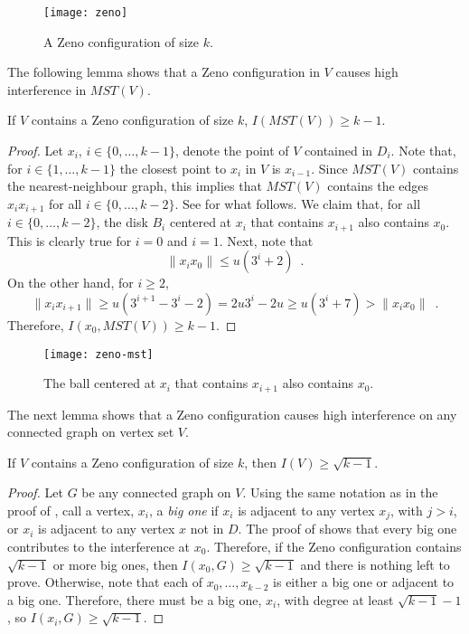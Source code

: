 \documentclass{patmorin}
\newcommand{\mst}{\mathit{MST}}
\begin{document}
\begin{figure}
  \begin{center}
    \texttt{[image: zeno]}
  \end{center}
  \caption{A Zeno configuration of size $k$.}
\end{figure}


The following lemma shows that a Zeno configuration in $V$ causes high
interference in $\mst(V)$.

\begin{lem}
If $V$ contains a Zeno configuration of size $k$, $I(\mst(V))\ge k-1$.
\end{lem}

\begin{proof}
Let $x_i$, $i\in\{0,\ldots,k-1\}$, denote the point of $V$ contained in
$D_i$.  Note that, for $i\in\{1,\ldots,k-1\}$ the closest point to $x_i$
in $V$ is $x_{i-1}$.  Since $\mst(V)$ contains the nearest-neighbour
graph, this implies that $\mst(V)$ contains the edges $x_ix_{i+1}$ for
all $i\in\{0,\ldots,k-2\}$.  See  for what follows.
We claim that, for all $i\in\{0,\ldots,k-2\}$, the disk $B_i$ centered
at $x_i$ that contains $x_{i+1}$ also contains $x_0$.  This is clearly
true for $i=0$ and $i=1$.  Next, note that
\[
  \|x_ix_0\| \le u(3^i+2) \enspace .
\]
On the other hand, for $i\ge 2$,
\[
  \|x_ix_{i+1}\| \ge u(3^{i+1}-3^i-2) = 2u3^i-2u \ge u(3^i + 7) > 
\|x_ix_0\| \enspace .
\]
Therefore, $I(x_0,\mst(V)) \ge k-1$.
\end{proof}

\begin{figure}
  \begin{center}
    \texttt{[image: zeno-mst]}
  \end{center}
  \caption{The ball centered at $x_i$ that contains $x_{i+1}$ also contains $x_0$.}
\end{figure}

The next lemma shows that a Zeno configuration causes high interference on
any connected graph on vertex set $V$.

\begin{lem}
If $V$ contains a Zeno configuration of size $k$, then $I(V)\ge\sqrt{k-1}$.
\end{lem}

\begin{proof}
Let $G$ be any connected graph on $V$.  Using the same notation as
in the proof of , call a vertex, $x_i$, a \emph{big
one} if $x_i$ is adjacent to any vertex $x_j$, with $j>i$, or $x_i$ is
adjacent to any vertex $x$ not in $D$.  The proof of 
shows that every big one contributes to the interference at $x_0$.
Therefore, if the Zeno configuration contains $\sqrt{k-1}$ or more big
ones, then $I(x_0,G)\ge\sqrt{k-1}$ and there is nothing left to prove.
Otherwise, note that each of $x_0,\ldots,x_{k-2}$ is either a big one
or adjacent to a big one. Therefore, there must be a big one, $x_i$,
with degree at least $\sqrt{k-1}-1$, so $I(x_i,G)\ge\sqrt{k-1}$.
\end{proof}
\end{document}
